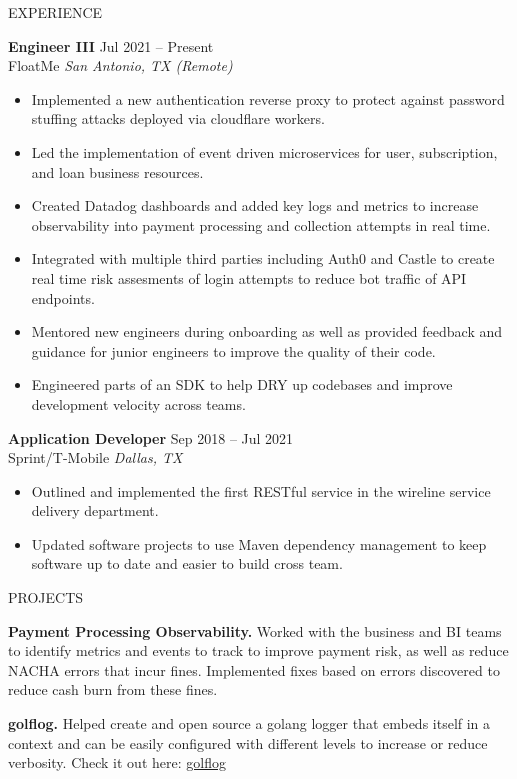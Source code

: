 \documentclass{resume} %
\begin{document}
\begin{rSection}{EXPERIENCE}

\textbf{Engineer III} \hfill Jul 2021 -- Present\\
FloatMe \hfill \textit{San Antonio, TX (Remote)}
 \begin{itemize}
    \itemsep-3pt {}
     \item Implemented a new authentication reverse proxy to protect against password stuffing attacks deployed via cloudflare workers.
     \item Led the implementation of event driven microservices for user, subscription, and loan business resources.
    \item Created Datadog dashboards and added key logs and metrics to increase observability into payment processing and collection attempts in real time.
    \item Integrated with multiple third parties including Auth0 and Castle to create real time risk assesments of login attempts to reduce bot traffic of API endpoints.
    \item Mentored new engineers during onboarding as well as provided feedback and guidance for junior engineers to improve the quality of their code.
    \item Engineered parts of an SDK to help DRY up codebases and improve development velocity across teams.
 \end{itemize}

\textbf{Application Developer} \hfill Sep 2018 -- Jul 2021\\
Sprint/T-Mobile \hfill \textit{Dallas, TX}
 \begin{itemize}
    \itemsep-3pt {}
     \item Outlined and implemented the first RESTful service in the wireline service delivery department.
     \item Updated software projects to use Maven dependency management to keep software up to date and easier to build cross team.
 \end{itemize}

\end{rSection}


\begin{rSection}{PROJECTS}
\vspace{-1.25em}
\item \textbf{Payment Processing Observability.} {Worked with the business and BI teams to identify metrics and events to track to improve payment risk, as well as reduce NACHA errors that incur fines. Implemented fixes based on errors discovered to reduce cash burn from these fines.}
\item \textbf{golflog.} {Helped create and open source a golang logger that embeds itself in a context and can be easily configured with different levels to increase or reduce verbosity. Check it out here: \href{https://github.com/floatme-corp/golflog}{golflog}}
\end{rSection}
\end{document}

